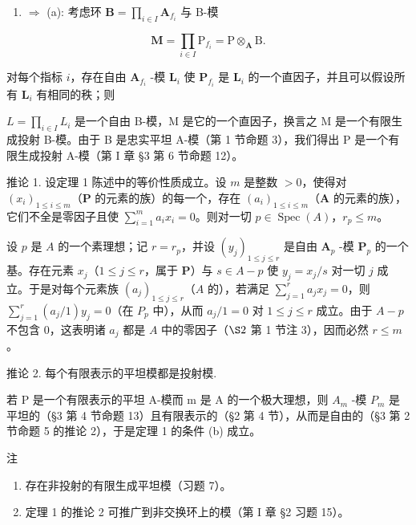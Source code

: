 \begin{enumerate}
\def\labelenumi{(\alph{enumi})}
\setcounter{enumi}{3}
\tightlist
\item
  \(\Rightarrow\) (a): 考虑环 \(\mathbf{B} = \prod_{i\in I}\mathbf{A}_{f_i}\) 与 B-模
\end{enumerate}

\[
\mathbf {M} = \prod_ {i \in I} \mathrm{P} _ {f _ {i}} = \mathrm{P} \otimes_ {\mathbf {A}} \mathrm{B}.
\]

对每个指标 \(i\)，存在自由 \(\mathbf{A}_{f_i}\) -模 \(\mathbf{L}_i\) 使 \(\mathbf{P}_{f_i}\) 是 \(\mathbf{L}_i\) 的一个直因子，并且可以假设所有 \(\mathbf{L}_i\) 有相同的秩；则

\(L = \prod_{i \in I} L_i\) 是一个自由 B-模，M 是它的一个直因子，换言之 M 是一个有限生成投射 B-模。由于 B 是忠实平坦 A-模（第 1 节命题 3），我们得出 P 是一个有限生成投射 A-模（第 I 章 §3 第 6 节命题 12）。

推论 1. 设定理 1 陈述中的等价性质成立。设 \(m\) 是整数 \(>0\)，使得对 \((x_{i})_{1\leqslant i\leqslant m}\)（\(\mathbf{P}\) 的元素的族）的每一个，存在 \((a_{i})_{1\leqslant i\leqslant m}\)（\(\mathbf{A}\) 的元素的族），它们不全是零因子且使 \(\sum_{i=1}^{m} a_i x_i = 0\)。则对一切 \(p \in \operatorname{Spec}(A)\)，\(r_p \leqslant m\)。

设 \(p\) 是 \(A\) 的一个素理想；记 \(r = r_p\)，并设 \((y_j)_{1 \leqslant j \leqslant r}\) 是自由 \(\mathbf{A}_{p}\) -模 \(\mathbf{P}_{p}\) 的一个基。存在元素 \(x_j\)（\(1 \leqslant j \leqslant r\)，属于 \(\mathbf{P}\)）与 \(s \in A - p\) 使 \(y_j = x_j / s\) 对一切 \(j\) 成立。于是对每个元素族 \((a_j)_{1 \leqslant j \leqslant r}\)（\(A\) 的），若满足 \(\sum_{j=1}^{r} a_j x_j = 0\)，则 \(\sum_{j=1}^{r} (a_j / 1) y_j = 0\)（在 \(P_p\) 中），从而 \(a_j / 1 = 0\) 对 \(1 \leqslant j \leqslant r\) 成立。由于 \(A - p\) 不包含 0，这表明诸 \(a_j\) 都是 \(A\) 中的零因子（\(\S 2\) 第 1 节注 3），因而必然 \(r \leqslant m\)。

推论 2. 每个有限表示的平坦模都是投射模.\par

若 P 是一个有限表示的平坦 A-模而 m 是 A 的一个极大理想，则 \(A_{m}\) -模 \(P_{m}\) 是平坦的（§3 第 4 节命题 13）且有限表示的（§2 第 4 节），从而是自由的（§3 第 2 节命题 5 的推论 2），于是定理 1 的条件 (b) 成立。

注

\begin{enumerate}
\def\labelenumi{(\arabic{enumi})}
\item
  存在非投射的有限生成平坦模（习题 7）。
\item
  定理 1 的推论 2 可推广到非交换环上的模（第 I 章 §2 习题 15）。
\end{enumerate}
\relax{}
